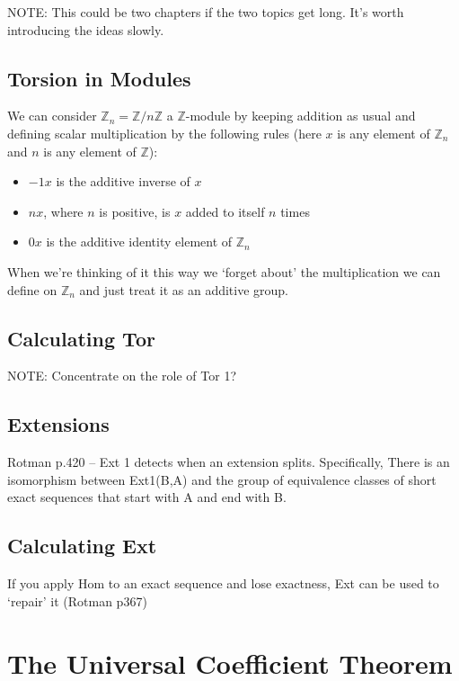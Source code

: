 \documentclass[oneside,english]{amsbook}
\numberwithin{section}{chapter}
\theoremstyle{plain}
\theoremstyle{definition}
\begin{document}
		NOTE: This could be two chapters if the two topics get long. It's worth introducing the ideas slowly.
		
		\section{Torsion in Modules}
			
			We can consider $\mathbb{Z}_n = \mathbb{Z}/n\mathbb{Z}$ a $\mathbb{Z}$-module by keeping addition as usual and defining scalar multiplication by the following rules (here $x$ is any element of $\mathbb{Z}_n$ and $n$ is any element of $\mathbb{Z}$):
			\begin{itemize}
				\item $-1x$ is the additive inverse of $x$
				\item $nx$, where $n$ is positive, is $x$ added to itself $n$ times
				\item $0x$ is the additive identity element of $\mathbb{Z}_n$
			\end{itemize}
			When we're thinking of it this way we `forget about' the multiplication we can define on $\mathbb{Z}_n$ and just treat it as an additive group.

		\section{Calculating Tor}

			NOTE: Concentrate on the role of Tor 1?

		\section{Extensions}
		
			Rotman p.420 -- Ext 1 detects when an extension splits. Specifically, There is an isomorphism between Ext1(B,A)
			and the group of equivalence classes of short exact sequences that start with A and end with B.
		
		\section{Calculating Ext}
		If you apply Hom to an exact sequence and lose exactness, Ext can be used to `repair' it (Rotman p367)


	\chapter{The Universal Coefficient Theorem}
		
\end{document}

